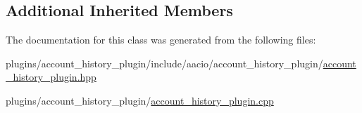 \subsection*{Additional Inherited Members}


The documentation for this class was generated from the following files\+:\begin{DoxyCompactItemize}
\item 
plugins/account\+\_\+history\+\_\+plugin/include/aacio/account\+\_\+history\+\_\+plugin/\mbox{\hyperlink{account__history__plugin_8hpp}{account\+\_\+history\+\_\+plugin.\+hpp}}\item 
plugins/account\+\_\+history\+\_\+plugin/\mbox{\hyperlink{account__history__plugin_8cpp}{account\+\_\+history\+\_\+plugin.\+cpp}}\end{DoxyCompactItemize}
